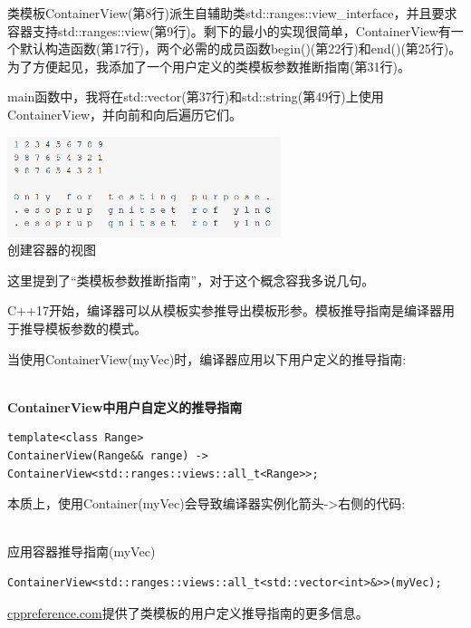 类模板ContainerView(第8行)派生自辅助类std::ranges::view\_interface，并且要求容器支持std::ranges::view(第9行)。剩下的最小的实现很简单，ContainerView有一个默认构造函数(第17行)，两个必需的成员函数begin()(第22行)和end()(第25行)。为了方便起见，我添加了一个用户定义的类模板参数推断指南(第31行)。

main函数中，我将在std::vector(第37行)和std::string(第49行)上使用ContainerView，并向前和向后遍历它们。

\begin{center}
\includegraphics[width=0.6\textwidth]{content/3/chapter5/images/1-3.png}\\
创建容器的视图
\end{center}

这里提到了“类模板参数推断指南”，对于这个概念容我多说几句。

\begin{tcolorbox}[breakable,enhanced jigsaw,colback=blue!5!white,colframe=blue!75!black,title={类模板参数推断指南}]
	
C++17开始，编译器可以从模板实参推导出模板形参。模板推导指南是编译器用于推导模板参数的模式。

当使用ContainerView(myVec)时，编译器应用以下用户定义的推导指南:

\hspace*{\fill} \\ %
\noindent
\textbf{ContainerView中用户自定义的推导指南}
\begin{lstlisting}[style=styleCXX]
template<class Range>
ContainerView(Range&& range) -> ContainerView<std::ranges::views::all_t<Range>>;
\end{lstlisting}

本质上，使用Container(myVec)会导致编译器实例化箭头->右侧的代码:

\hspace*{\fill} \\ %
\noindent
应用容器推导指南(myVec)
\begin{lstlisting}[style=styleCXX]
ContainerView<std::ranges::views::all_t<std::vector<int>&>>(myVec);
\end{lstlisting}

\href{https://en.cppreference.com/w/cpp/language/class_template_argument_deduction}{cppreference.com}提供了类模板的用户定义推导指南的更多信息。
\end{tcolorbox}

